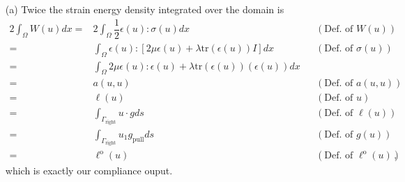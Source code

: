 \documentclass{article}
\begin{document}
\begin{itemize}
	\item[(a)] Twice the strain energy density integrated over the domain is
	\begin{alignat*}
		2\int_{\Omega}W(u)dx =& 2\int_\Omega \dfrac{1}{2}\epsilon(u):\sigma(u)dx &&(\text{Def. of } W(u))\\
		=& \int_{\Omega} \epsilon(u) : \left[2 \mu \epsilon(u) + \lambda\text{tr}(\epsilon(u))I\right] dx &&(\text{Def. of } \sigma(u))\\
		=& \int_{\Omega} 2 \mu \epsilon(u):\epsilon(u) + \lambda\text{tr}(\epsilon(u))(\epsilon(u))dx \\
		=& a(u,u) &&(\text{Def. of } a(u,u))\\
		=& \ell(u) &&(\text{Def. of } u)\\
		=& \int_{\Gamma_\text{right}}u\cdot gds &&(\text{Def. of } \ell(u))\\
		=& \int_{\Gamma_\text{right}}u_1 g_{\text{pull}}ds &&(\text{Def. of } g(u))\\
		=& \ell^\text{o}(u) &&(\text{Def. of } \ell^\text{o}(u)),
	\end{alignat*}
	which is exactly our compliance ouput. 
	

\end{itemize}
\end{document}
